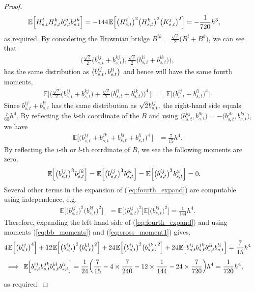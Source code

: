 \documentclass[sn-mathphys-num]{sn-jnl}%
\newcommand{\E}{\mathbb{E}}
\newcommand{\m}{\hspace{0.25mm}}
\begin{document}
\begin{proof}
\begin{align*}
\E\Big[H_{s,t}^i H_{s,t}^k\m b_{s,t}^{ij}b_{s,t}^{\m jk}\Big] & = - 144\m\E\Big[\big(H_{s,t}^i\big)^2\big(H_{s,t}^k\big)^2\big(K_{s,t}^j\big)^2\Big] = -\frac{1}{720}h^3,
\end{align*}
as required. By considering the Brownian bridge $B^{ik} = \frac{\sqrt{2}}{2}\big(B^i + B^k\big)$, we can see that
\begin{align*}
\bigg(\frac{\sqrt{2}}{2}\Big(b_{s,t}^{ij} + b_{s,t}^{kj}\Big), \frac{\sqrt{2}}{2}\Big(b_{s,t}^{li} + b_{s,t}^{lk}\Big)\bigg),
\end{align*}
has the same distribution as $\big(b_{s,t}^{ij}\m, b_{s,t}^{li}\big)$ and hence will have the same fourth moments,
\begin{align*}
\E\bigg[\bigg(\frac{\sqrt{2}}{2}\Big(b_{s,t}^{ij} + b_{s,t}^{kj}\Big) + \frac{\sqrt{2}}{2}\Big(b_{s,t}^{li} + b_{s,t}^{lk}\Big)\bigg)^4\,\bigg] & = \E\Big[\big(b_{s,t}^{ij} + b_{s,t}^{li}\big)^4\Big].
\end{align*}
Since $b_{s,t}^{ij} + b_{s,t}^{li}$ has the same distribution as $\sqrt{2}\m b_{s,t}^{ij}$, the right-hand side equals $\frac{7}{60}h^4$. By reflecting the $k$-th coordinate of the $B$ and using $\big(b_{s,t}^{kj}, b_{s,t}^{lk}\big) = - \big(b_{s,t}^{jk}, b_{s,t}^{kl}\big)$, we have
\begin{align}\label{eq:fourth_expand}
\E\bigg[\Big(b_{s,t}^{ij} + b_{s,t}^{jk} + b_{s,t}^{kl} + b_{s,t}^{li}\Big)^4\,\bigg] & = \frac{7}{15}h^4.
\end{align}
By reflecting the $i$-th or $l$-th corrdinate of $B$, we see the following moments are zero.
\begin{align*}
\E\Big[\big(b_{s,t}^{ij}\big)^3\m b_{s,t}^{\m jk}\Big] & = \E\Big[\big(b_{s,t}^{ij}\big)^3\m b_{s,t}^{kl}\Big]  = \E\Big[\big(b_{s,t}^{ij}\big)^3\m b_{s,t}^{li}\Big]  = 0. 
\end{align*}
Several other terms in the expansion of (\ref{eq:fourth_expand}) are computable using independence, e.g.
\begin{align*}
\E\Big[\big(b_{s,t}^{ij}\big)^2 \big(b_{s,t}^{kl}\big)^2\Big] & = \E\Big[\big(b_{s,t}^{ij}\big)^2\Big] \E\Big[\big(b_{s,t}^{kl}\big)^2\Big] = \frac{1}{144}h^4. 
\end{align*}
Therefore, expanding the left-hand side of (\ref{eq:fourth_expand}) and using moments (\ref{eq:bb_moments}) and (\ref{eq:cross_moment1}) gives,
\begin{align*}
&4\m\E\Big[\big(b_{s,t}^{ij}\big)^4\Big] + 12\m\E\Big[\big(b_{s,t}^{ij}\big)^2 \big(b_{s,t}^{kl}\big)^2\Big] + 24\m\E\Big[\big(b_{s,t}^{ij}\big)^2 \big(b_{s,t}^{jk}\big)^2\Big] + 24\m\E\Big[b_{s,t}^{ij}b_{s,t}^{\m jk}b_{s,t}^{kl}b_{s,t}^{li}\Big] = \frac{7}{15}h^4\\[3pt]
&\implies\, \E\Big[b_{s,t}^{ij}b_{s,t}^{\m jk}b_{s,t}^{kl}b_{s,t}^{li}\Big] = \frac{1}{24}\bigg(\frac{7}{15} - 4\times \frac{7}{240}- 12\times \frac{1}{144} - 24\times \frac{7}{720}\bigg)h^4 = \frac{1}{720}h^4,
\end{align*}
as required.
\end{proof}
\end{document}
